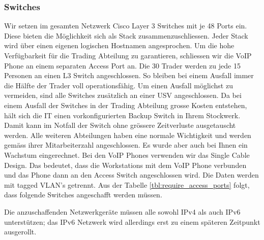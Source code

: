 \subsubsection{Switches}
Wir setzen im gesamten Netzwerk Cisco Layer 3 Switches mit je 48 Ports ein. Diese bieten die Möglichkeit sich als Stack zusammenzuschliessen. Jeder Stack wird über einen eigenen logischen Hostnamen angesprochen. Um die hohe Verfügbarkeit für die Trading Abteilung zu garantieren, schliessen wir die VoIP Phone an einem separaten Access Port an. Die 30 Trader werden zu jede 15 Personen an einen L3 Switch angeschlossen. So bleiben bei einem Ausfall immer die Hälfte der Trader voll operationsfähig. Um einen Ausfall möglichst zu vermeiden, sind alle Switches zusätzlich an einer USV angeschlossen. Da bei einem Ausfall der Switches in der Trading Abteilung grosse Kosten entstehen, hält sich die IT einen vorkonfigurierten Backup Switch in Ihrem Stockwerk. Damit kann im Notfall der Switch ohne grössere Zeitverluste ausgetauscht werden. Alle weiteren Abteilungen haben eine normale Wichtigkeit und werden gemäss ihrer Mitarbeiterzahl angeschlossen. Es wurde aber auch bei Ihnen ein Wachstum eingerechnet. Bei den VoIP Phones verwenden wir das Single Cable Design. Das bedeutet, dass die Workstations mit dem VoIP Phone verbunden und das Phone dann an den Access Switch angeschlossen wird. Die Daten werden mit tagged VLAN's getrennt. Aus der Tabelle \ref{tbl:require_access_ports} folgt, dass folgende Switches angeschafft werden müssen.

Die anzuschaffenden Netzwerkgeräte müssen alle sowohl IPv4 als auch IPv6 unterstützen; das IPv6 Netzwerk wird allerdings erst zu einem späteren Zeitpunkt ausgerollt.

